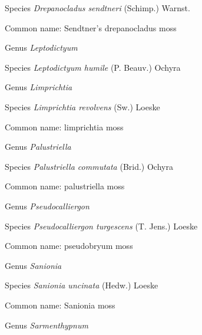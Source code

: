 \documentclass[9pt, article]{memoir}
\begin{document}
\begin{multicols}{2}
\vspace{6pt}\noindent\hspace{36pt}Species \textit{Drepanocladus sendtneri} (Schimp.) Warnst.


Common name: Sendtner's drepanocladus moss

\vspace{6pt}\noindent\hspace{30pt}Genus \textit{Leptodictyum}


\vspace{6pt}\noindent\hspace{36pt}Species \textit{Leptodictyum humile} (P. Beauv.) Ochyra


\vspace{6pt}\noindent\hspace{30pt}Genus \textit{Limprichtia}


\vspace{6pt}\noindent\hspace{36pt}Species \textit{Limprichtia revolvens} (Sw.) Loeske


Common name: limprichtia moss

\vspace{6pt}\noindent\hspace{30pt}Genus \textit{Palustriella}


\vspace{6pt}\noindent\hspace{36pt}Species \textit{Palustriella commutata} (Brid.) Ochyra


Common name: palustriella moss

\vspace{6pt}\noindent\hspace{30pt}Genus \textit{Pseudocalliergon}


\vspace{6pt}\noindent\hspace{36pt}Species \textit{Pseudocalliergon turgescens} (T. Jens.) Loeske


Common name: pseudobryum moss

\vspace{6pt}\noindent\hspace{30pt}Genus \textit{Sanionia}


\vspace{6pt}\noindent\hspace{36pt}Species \textit{Sanionia uncinata} (Hedw.) Loeske


Common name: Sanionia moss

\vspace{6pt}\noindent\hspace{30pt}Genus \textit{Sarmenthypnum}



\end{multicols}
\end{document}
